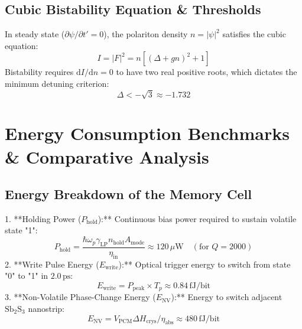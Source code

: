 \documentclass[11pt,oneside]{article}
\begin{document}
\subsection{Cubic Bistability Equation \& Thresholds}

In steady state ($\partial \psi / \partial t' = 0$), the polariton density $n = |\psi|^2$ satisfies the cubic equation:
\begin{equation}
I = |F|^2 = n \left[ (\Delta + g n)^2 + 1 \right]
\label{eq:cubic_bistability}
\end{equation}
Bistability requires $\mathrm{d}I / \mathrm{d}n = 0$ to have two real positive roots, which dictates the minimum detuning criterion:
\begin{equation}
\Delta < -\sqrt{3} \approx -1.732
\end{equation}

\section{Energy Consumption Benchmarks \& Comparative Analysis}
\label{sec:energy_benchmarks}

\subsection{Energy Breakdown of the Memory Cell}

1. **Holding Power ($P_{\text{hold}}$):** Continuous bias power required to sustain volatile state "1":
   \begin{equation}
   P_{\text{hold}} = \frac{\hbar \omega_p \gamma_{\text{LP}} n_{\text{hold}} A_{\text{mode}}}{\eta_{\text{in}}} \approx 120\,\mu\text{W} \quad (\text{for } Q=2000)
   \end{equation}
2. **Write Pulse Energy ($E_{\text{write}}$):** Optical trigger energy to switch from state "0" to "1" in $2.0\,\text{ps}$:
   \begin{equation}
   E_{\text{write}} = P_{\text{peak}} \times T_p \approx 0.84\,\text{fJ/bit}
   \end{equation}
3. **Non-Volatile Phase-Change Energy ($E_{\text{NV}}$):** Energy to switch adjacent $\text{Sb}_2\text{S}_3$ nanostrip:
   \begin{equation}
   E_{\text{NV}} = V_{\text{PCM}} \Delta H_{\text{crys}} / \eta_{\text{abs}} \approx 480\,\text{fJ/bit}
   \end{equation}
\end{document}
